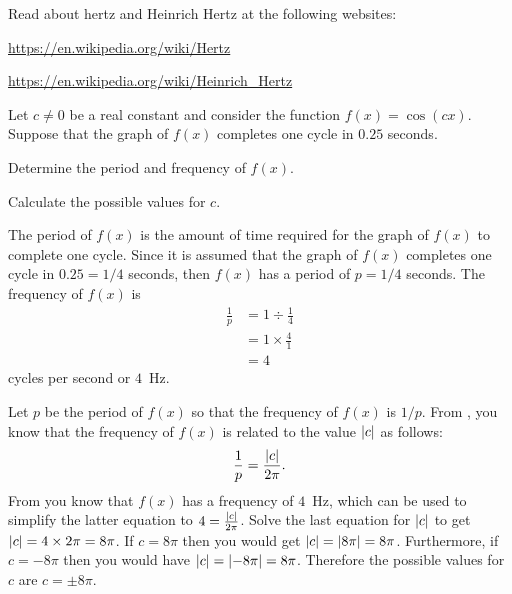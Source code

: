 \documentclass[a4paper,oneside,12pt]{article}
\begin{document}
\begin{exercise}
Read about hertz and Heinrich Hertz at the following websites:
\begin{packeditem}
\item \url{https://en.wikipedia.org/wiki/Hertz}

\item \url{https://en.wikipedia.org/wiki/Heinrich_Hertz}
\end{packeditem}
\end{exercise}

\begin{example}
Let $c \neq 0$ be a real constant and consider the function
$f(x) = \cos(cx)$.  Suppose that the graph of $f(x)$ completes one
cycle in $0.25$ seconds.
\begin{packedenum}
\item\label{subeg:trigonometric:cos_1_cycle_0.25_seconds_period}
  Determine the period and frequency of $f(x)$.

\item\label{subeg:trigonometric:cos_1_cycle_0.25_seconds_c_factor}
  Calculate the possible values for $c$.
\end{packedenum}
\end{example}

\begin{solution}
The period of $f(x)$ is the amount of time required for the graph of
$f(x)$ to complete one cycle.  Since it is assumed that the graph of
$f(x)$ completes one cycle in $0.25 = 1/4$ seconds, then $f(x)$ has a
period of $p = 1/4$ seconds.  The frequency of $f(x)$ is
\begin{align*}
\frac{1}{p}
&=
1 \div \frac{1}{4} \\[4pt]
&=
1 \times \frac{4}{1} \\[4pt]
&=
4
\end{align*}
cycles per second or $4$~Hz.

Let $p$ be the period of $f(x)$ so that the frequency of $f(x)$ is
$1 / p$.  From , you
know that the frequency of $f(x)$ is related to the value
$\lvert c\rvert$ as follows:
\[
\frac{1}{p}
=
\frac{\lvert c\rvert}{2\pi}.
\]
From  you
know that $f(x)$ has a frequency of $4$~Hz, which can be used to
simplify the latter equation to $4 = \frac{\lvert c\rvert}{2\pi}$.
Solve the last equation for $\lvert c\rvert$ to get
$\lvert c\rvert = 4 \times 2\pi = 8\pi$.  If $c = 8\pi$ then you
would get $\lvert c\rvert = \lvert8\pi\rvert = 8\pi$.
Furthermore, if $c = -8\pi$ then you would have
$\lvert c\rvert = \lvert-8\pi\rvert = 8\pi$.  Therefore the
possible values for $c$ are $c = \pm 8\pi$.
\end{solution}
\end{document}
